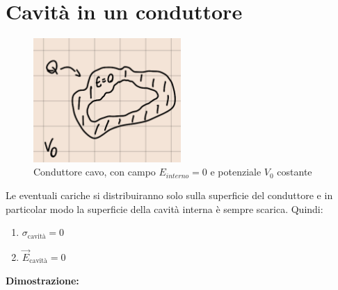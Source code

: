 \documentclass[a4paper, 12pt]{book}
\theoremstyle{plain}
\begin{document}
\section{Cavità in un conduttore}

\begin{figure}
    \includegraphics[width=0.5\textwidth]{conduttore_cavo.png}
    \caption[]{Conduttore cavo, con campo $E_{interno} = 0$ e potenziale $V_0$ costante}
\end{figure}

Le eventuali cariche si distribuiranno solo sulla superficie del conduttore e in particolar modo la superficie della cavità interna è sempre scarica.
Quindi:

\begin{enumerate}
    \item $\sigma_{\textrm{cavità}} = 0$
    \item $\vec{E}_{\textrm{cavità}} = 0$
\end{enumerate}

\textbf{Dimostrazione:}
\end{document}
